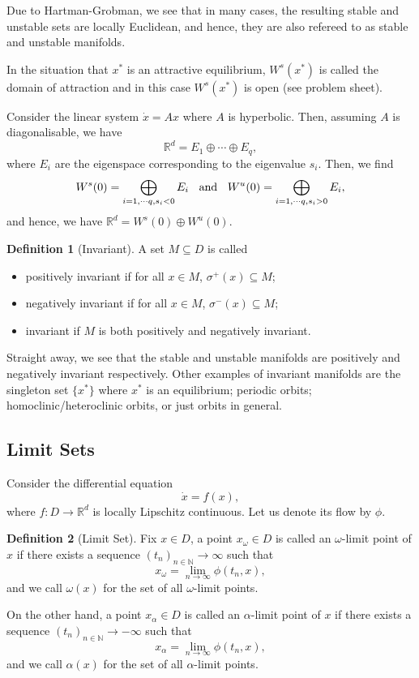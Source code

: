 \documentclass[
]{article}
\theoremstyle{definition}
\theoremstyle{definition}
\newtheorem{definition}{Definition}[section]
\begin{document}
Due to Hartman-Grobman, we see that in many cases, the resulting stable
and unstable sets are locally Euclidean, and hence, they are also
refereed to as stable and unstable manifolds.

In the situation that \(x^*\) is an attractive equilibrium, \(W^s(x^*)\)
is called the domain of attraction and in this case \(W^s(x^*)\) is open
(see problem sheet).

Consider the linear system \(\dot x = A x\) where \(A\) is hyperbolic.
Then, assuming \(A\) is diagonalisable, we have
\[\mathbb{R}^d = E_1 \oplus \cdots \oplus E_q,\] where \(E_i\) are the
eigenspace corresponding to the eigenvalue \(s_i\). Then, we find
\[W^s(0) = \bigoplus_{i = 1, \cdots q,\\ s_i < 0} E_i 
  \hspace{2mm} \text{ and } \hspace{2mm}
  W^u(0) = \bigoplus_{i = 1, \cdots q,\\ s_i > 0} E_i,\] and hence, we
have \(\mathbb{R}^d = W^s(0) \oplus W^u(0)\).

\begin{definition}[Invariant]
  A set \(M \subseteq D\) is called 
  \begin{itemize}
    \item positively invariant if for all \(x \in M\), \(\sigma^+(x) \subseteq M\);
    \item negatively invariant if for all \(x \in M\), \(\sigma^-(x) \subseteq M\);
    \item invariant if \(M\) is both positively and negatively invariant.
  \end{itemize}
\end{definition}

Straight away, we see that the stable and unstable manifolds are
positively and negatively invariant respectively. Other examples of
invariant manifolds are the singleton set \(\{x^*\}\) where \(x^*\) is
an equilibrium; periodic orbits; homoclinic/heteroclinic orbits, or just
orbits in general.

\hypertarget{limit-sets}{%
\subsection{Limit Sets}\label{limit-sets}}

Consider the differential equation \[\dot x = f(x),\] where
\(f : D \to \mathbb{R}^d\) is locally Lipschitz continuous. Let us
denote its flow by \(\phi\).

\begin{definition}[Limit Set]
  Fix \(x \in D\), a point \(x_\omega \in D\) is called an \(\omega\)-limit point 
  of \(x\) if there exists a sequence \((t_n)_{n \in \mathbb{N}} \to \infty\) such that 
  \[x_\omega = \lim_{n \to \infty}\phi(t_n, x),\]
  and we call \(\omega(x)\) for the set of all \(\omega\)-limit points.

  On the other hand, a point \(x_\alpha \in D\) is called an \(\alpha\)-limit point 
  of \(x\) if there exists a sequence \((t_n)_{n \in \mathbb{N}} \to -\infty\) such that 
  \[x_\alpha = \lim_{n \to \infty}\phi(t_n, x),\]
  and we call \(\alpha(x)\) for the set of all \(\alpha\)-limit points.
\end{definition}
\end{document}
